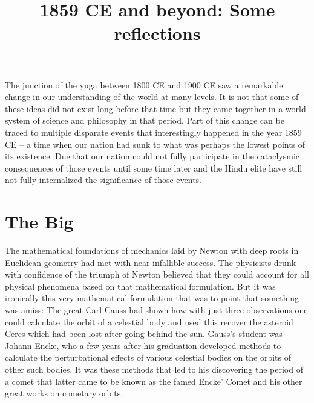 \documentclass[11pt]{article} %
\title{\huge \textbf{1859 CE and beyond: Some reflections}}
\author{}
\date{}
\numberwithin{equation}{section}
\begin{document}
\maketitle
The junction of the yuga between 1800 CE and 1900 CE saw a remarkable change in our understanding of the world at many levels. It is not that some of these ideas did not exist long before that time but they came together in a world-system of science and philosophy in that period. Part of this change can be traced to multiple disparate events that interestingly happened in the year 1859 CE -- a time when our nation had sunk to what was perhaps the lowest points of its existence. Due that our nation could not fully participate in the cataclysmic consequences of those events until some time later and the Hindu elite have still not fully internalized the significance of those events. 

\section{The Big}
The mathematical foundations of mechanics laid by Newton with deep roots in Euclidean geometry had met with near infallible success. The physicists drunk with confidence of the triumph of Newton believed that they could account for all physical phenomena based on that mathematical formulation. But it was ironically this very mathematical formulation that was to point that something was amiss: The great Carl Causs had shown how with just three observations one could calculate the orbit of a celestial body and used this recover the asteroid Ceres which had been lost after going behind the sun. Gauss’s student was Johann  Encke, who a few years after his graduation developed methods to calculate the perturbational effects of various celestial bodies on the orbits of other such bodies. It was these methods that led to his discovering the period of a comet that latter came to be known as the famed Encke’ Comet and his other great works on cometary orbits.\\
\end{document}
